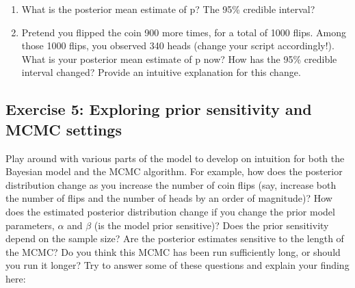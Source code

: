 \begin{enumerate}[label=\textnormal{\arabic*)}]
	\item What is the posterior mean estimate of p? The 95\% credible interval?\medskip\\
\TextField[name=mcmc_posterior_estimates,backgroundcolor=TextFieldBackgroundColor,color=TextFieldTextColor,bordercolor=TextFieldBoxColor,height=2cm,width=\TextFieldWidth,multiline=true]{}
	\item Pretend you flipped the coin 900 more times, for a total of 1000 flips. Among those 1000 flips, you observed 340 heads (change your script accordingly!). What is your posterior mean estimate of p now? How has the 95\% credible interval changed? Provide an intuitive explanation for this change.\medskip\\
\TextField[name=mcmc_posterior_estimates_large,,backgroundcolor=TextFieldBackgroundColor,color=TextFieldTextColor,bordercolor=TextFieldBoxColor,height=2cm,width=\TextFieldWidth,multiline=true]{}
\end{enumerate}


\subsection{Exercise 5: Exploring prior sensitivity and MCMC settings}
Play around with various parts of the model to develop on intuition for both the Bayesian model and the MCMC algorithm.
For example, how does the posterior distribution change as you increase the number of coin flips (say, increase both the number of flips and the number of heads by an order of magnitude)?
How does the estimated posterior distribution change if you change the prior model parameters, $\alpha$ and $\beta$ (\IE is the model prior sensitive)?
Does the prior sensitivity depend on the sample size?
Are the posterior estimates sensitive to the length of the MCMC?
Do you think this MCMC has been run sufficiently long, or should you run it longer? Try to answer some of these questions and explain your finding here:\\
\forceindent\TextField[name=mcmc_exploration,backgroundcolor=TextFieldBackgroundColor,color=TextFieldTextColor,bordercolor=TextFieldBoxColor,height=5cm,width=\TextFieldWidth,multiline=true]{}

